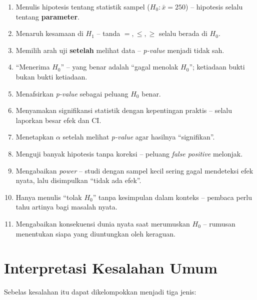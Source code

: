 \documentclass[
  indonesian,
  letterpaper,
]{book}
\providecommand{\tightlist}{%
  \setlength{\itemsep}{0pt}\setlength{\parskip}{0pt}}
\begin{document}
\begin{enumerate}
\def\labelenumi{\arabic{enumi}.}
\tightlist
\item
  Menulis hipotesis tentang statistik sampel (\(H_0: \bar{x} = 250\)) --
  hipotesis selalu tentang \textbf{parameter}.
\item
  Menaruh kesamaan di \(H_1\) -- tanda \(=, \le, \ge\) selalu berada di
  \(H_0\).
\item
  Memilih arah uji \textbf{setelah} melihat data -- \emph{p-value}
  menjadi tidak sah.
\item
  ``Menerima \(H_0\)'' -- yang benar adalah ``gagal menolak \(H_0\)'';
  ketiadaan bukti bukan bukti ketiadaan.
\item
  Menafsirkan \emph{p-value} sebagai peluang \(H_0\) benar.
\item
  Menyamakan signifikansi statistik dengan kepentingan praktis -- selalu
  laporkan besar efek dan CI.
\item
  Menetapkan \(\alpha\) setelah melihat \emph{p-value} agar hasilnya
  ``signifikan''.
\item
  Menguji banyak hipotesis tanpa koreksi -- peluang \emph{false
  positive} melonjak.
\item
  Mengabaikan \emph{power} -- studi dengan sampel kecil sering gagal
  mendeteksi efek nyata, lalu disimpulkan ``tidak ada efek''.
\item
  Hanya menulis ``tolak \(H_0\)'' tanpa kesimpulan dalam konteks --
  pembaca perlu tahu artinya bagi masalah nyata.
\item
  Mengabaikan konsekuensi dunia nyata saat merumuskan \(H_0\) -- rumusan
  menentukan siapa yang diuntungkan oleh keraguan.
\end{enumerate}

\section{Interpretasi Kesalahan Umum}\label{interpretasi-kesalahan-umum}

Sebelas kesalahan itu dapat dikelompokkan menjadi tiga jenis:
\end{document}

